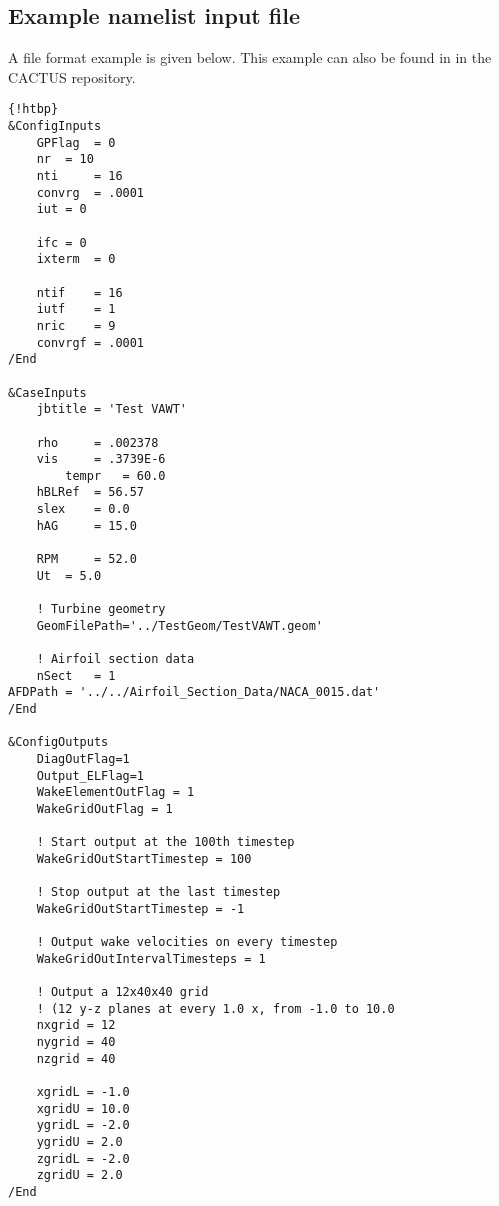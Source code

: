 \subsection{Example namelist input file}
A file format example is given below. This example can also be found in  in the CACTUS repository.

\begin{lstlisting}{!htbp}
&ConfigInputs
    GPFlag  = 0
    nr  = 10
    nti     = 16
    convrg  = .0001
    iut = 0
    
    ifc = 0
    ixterm  = 0

    ntif    = 16
    iutf    = 1
    nric    = 9
    convrgf = .0001
/End

&CaseInputs
    jbtitle = 'Test VAWT'  

    rho     = .002378  
    vis     = .3739E-6                                   
        tempr   = 60.0 
    hBLRef  = 56.57
    slex    = 0.0
    hAG     = 15.0
                                            
    RPM     = 52.0
    Ut  = 5.0   

    ! Turbine geometry
    GeomFilePath='../TestGeom/TestVAWT.geom'

    ! Airfoil section data
    nSect   = 1
AFDPath = '../../Airfoil_Section_Data/NACA_0015.dat' 
/End

&ConfigOutputs 
    DiagOutFlag=1
    Output_ELFlag=1
    WakeElementOutFlag = 1
    WakeGridOutFlag = 1

    ! Start output at the 100th timestep
    WakeGridOutStartTimestep = 100

    ! Stop output at the last timestep  
    WakeGridOutStartTimestep = -1
    
    ! Output wake velocities on every timestep
    WakeGridOutIntervalTimesteps = 1

    ! Output a 12x40x40 grid
    ! (12 y-z planes at every 1.0 x, from -1.0 to 10.0 
    nxgrid = 12
    nygrid = 40
    nzgrid = 40

    xgridL = -1.0
    xgridU = 10.0
    ygridL = -2.0
    ygridU = 2.0
    zgridL = -2.0
    zgridU = 2.0
/End
\end{lstlisting}
